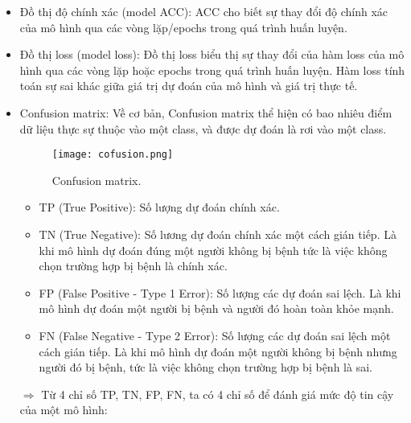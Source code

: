 \begin{itemize}
	\item Đồ thị độ chính xác (model ACC): ACC cho biết sự thay đổi độ chính xác của mô hình qua các vòng lặp/epochs trong quá trình huấn luyện.
	
	\item Đồ thị loss (model loss): Đồ thị loss biểu thị sự thay đổi của hàm loss của mô hình qua các vòng lặp hoặc epochs trong quá trình huấn luyện. Hàm loss tính toán sự sai khác giữa giá trị dự đoán của mô hình và giá trị thực tế.
	
	\item Confusion matrix: Về cơ bản, Confusion matrix thể hiện có bao nhiêu điểm dữ liệu thực sự thuộc vào một class, và được dự đoán là rơi vào một class. 
	
	\begin{figure}[h!]
		\centering
		\texttt{[image: cofusion.png]}
		\caption[Confusion matrix.]{Confusion matrix.}
		\label{fig:cm} 
	\end{figure}

	\begin{itemize}
		\item TP (True Positive): Số lượng dự đoán chính xác.
		
		\item TN (True Negative): Số lương dự đoán chính xác một cách gián tiếp. Là khi mô hình dự đoán đúng một người không bị bệnh tức là việc không chọn trường hợp bị bệnh là chính xác.
		
		\item FP (False Positive - Type 1 Error): Số lượng các dự đoán sai lệch. Là khi mô hình dự đoán một người bị bệnh và người đó hoàn toàn khỏe mạnh.
		
		\item FN (False Negative - Type 2 Error): Số lượng các dự đoán sai lệch một cách gián tiếp. Là khi mô hình dự đoán một người không bị bệnh nhưng người đó bị bệnh, tức là việc không chọn trường hợp bị bệnh là sai. 		
	\end{itemize}
	$\Longrightarrow$ Từ 4 chỉ số TP, TN, FP, FN, ta có 4 chỉ số để đánh giá mức độ tin cậy của một mô hình:
\end{itemize}

